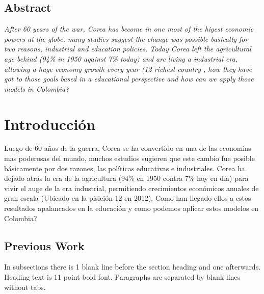 %
\maketitle

\thispagestyle{empty}

\subsection*{\centering Abstract}
{\em
After 60 years of the war, Corea has become in one most of the higest economic powers at the globe, many studies suggest the change was possible basically for two reasons, industrial and education policies. Today Corea left the agricultural age behind (94\% in 1950 against 7\% today) and are living a industrial era, allowing a huge economy growth every year (12 richest country \cite{korea:rich}, how they have got to those goals based in a educational perspective and how can we apply those models in Colombia? 
}

\section{Introducci\'on}

Luego de 60 a\~nos de la guerra, Corea se ha convertido en una de las economias mas poderosas del mundo, muchos estudios sugieren que este cambio fue posible b\'asicamente por dos razones, las pol\'iticas educativas e industriales. Corea ha dejado atr\'as la era de la agricultura (94\% en 1950 contra 7\% hoy en d\'ia) para vivir el auge de la era industrial, permitiendo crecimientos econ\'omicos anuales de gran escala (Ubicado en la pisici\'on 12 en 2012)\cite{korea:rich}. Como han llegado ellos a estos resultados apalancados en la educaci\'on y como podemos aplicar estos modelos en Colombia?

\subsection{Previous Work}
In subsections there is 1 blank line before the section heading and one 
afterwards.  Heading text is 11 point bold font.  Paragraphs are separated by 
blank lines without tabs.

